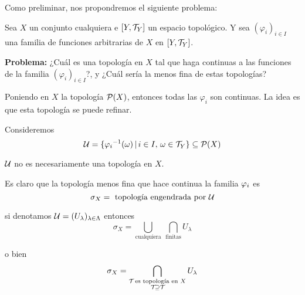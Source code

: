 Como preliminar, nos propondremos el siguiente problema:

Sea $X$ un conjunto cualquiera e $[Y, \TAU[Y] ]$ un espacio topológico. Y sea $(\varphi_{i})_{i \in I}$ una familia de funciones arbitrarias de $X$ en $[Y, \TAU[Y] ]$.

\textbf{Problema:} ¿Cuál es una topología en $X$ tal que haga continuas a las funciones de la familia $(\varphi_{i})_{i \in I}$?, y ¿Cuál sería la menos fina de estas topologías?

Poniendo en $X$ la topología $\cp(X)$, entonces todas las $\varphi_{i}$ son continuas. La idea es que esta topología se puede refinar.

Consideremos $$
\cu = \{ 
{\PHI[i]}^{-1} (\omega) \,|\, i \in I,\, \omega \in \TAU[Y]
\} \subseteq \cp (X)
$$

$\cu$ no es necesariamente una topología en $X$.

Es claro que la topología menos fina que hace continua la familia $\PHI[i]$ es $$
\sigma_X = \text{ topología engendrada por $\cu$}
$$

si denotamos $\cu = (U_{\lambda})_{\lambda \in \Lambda}$ entonces $$
\sigma_{X} 
= \bigcup_{\text{cualquiera}} \ \bigcap_{\text{finitas}} U_{\lambda}
$$

o bien $$
\sigma_{X} 
= \bigcap_{
\begin{subarray}{c}
\TAU \text{ es topología en } X \\ \TAU \supseteq \TAU
\end{subarray}
} U_{\lambda}
$$

